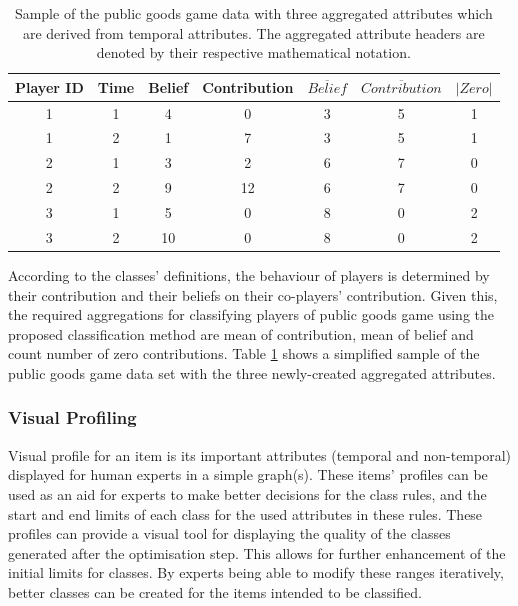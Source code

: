 \begin{table}[!h]
    \small
    \centering
    \caption{Sample of the public goods game data with three aggregated  attributes which are derived from temporal attributes. The aggregated attribute headers are denoted by their respective mathematical notation.}
    \label{tab:CreatingAggrigations}
    \begin{tabular}{ccccccc}
        \toprule
        Player ID & Time & Belief & Contribution & \textbf{$\overline{Belief}$} & \textbf{$\overline{Contribution}$} & \textbf{$\left |Zero  \right |$} \\ \midrule
        1         & 1    & 4      & 0            & 3                    & 5                     & 1 \\
        1         & 2    & 1      & 7            & 3                    & 5                     & 1 \\
        2         & 1    & 3      & 2            & 6                    & 7                     & 0 \\
        2         & 2    & 9      & 12           & 6                    & 7                     & 0 \\
        3         & 1    & 5      & 0            & 8                    & 0                     & 2 \\
        3         & 2    & 10     & 0            & 8                    & 0                     & 2 \\
        \bottomrule
    \end{tabular}
\end{table}

According to the classes' definitions, the behaviour of players is determined by their contribution and their beliefs on their co-players' contribution. Given this, the required aggregations for classifying players of public goods game using the proposed classification method are mean of contribution, mean of belief and count number of zero contributions. Table \ref{tab:CreatingAggrigations} shows a simplified sample of the public goods game data set with the three newly-created aggregated attributes.


\subsubsection{Visual Profiling}

Visual profile for an item is its important attributes (temporal and non-temporal) displayed for human experts in a simple graph(s). These items' profiles can be used as an aid for experts to make better decisions for the class rules, and the start and end limits of each class for the used attributes in these rules. These profiles can provide a visual tool for displaying the quality of the classes generated after the optimisation step. This allows for further enhancement of the initial limits for classes. By experts being able to modify these ranges iteratively, better classes can be created for the items intended to be classified.

